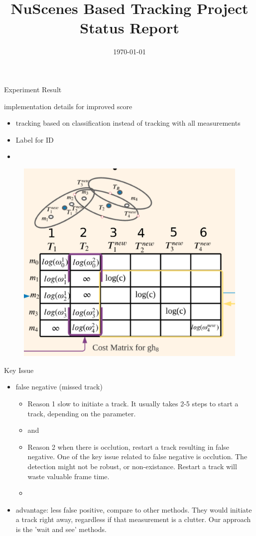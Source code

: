 \documentclass[aspectratio=169,xcolor=dvipsnames]{beamer}
\title{NuScenes Based Tracking Project Status Report} %
\date{\today} %
\begin{document}
\begin{frame}
    \titlepage
\end{frame}

\begin{frame}{Experiment Result}
    \href{https://docs.google.com/spreadsheets/d/e/2PACX-1vQg2MSCst4ShlC0e7T_lr_q4azo-DfDo53On89BjeisHAKJrggMLoTUxcvurpXomLZilYKoWmMMf6U4/pubhtml}{}
    \href{https://motchallenge.net/results/CVPR_2019_Tracking_Challenge/}{}
\end{frame}

\begin{frame}{implementation details for improved score}
    \begin{itemize}
        \item{tracking based on classification instead of tracking with all measurements}
        \item{Label for ID}
        \item {}
    \end{itemize}
    \begin{figure}
        \includegraphics[width=0.4\linewidth]{pmbm/2.png}
    \end{figure}
\end{frame}

\begin{frame}{Key Issue}
    \begin{itemize}
        \item{false negative (missed track)}
        \begin{itemize}
            \item{Reason 1 slow to initiate a track. It usually takes 2-5 steps to start a track, depending on the parameter. }
            \item { and }
            \item{Reason 2 when there is occlution, restart a track resulting in false negative. One of the key issue related to false negative is occlution. The detection might not be robust, or non-existance. Restart a track will waste valuable frame time. }
            \item {}
        \end{itemize}
        \item{advantage: less false positive, compare to other methods. They would initiate a track right away, regardless if that measurement is a clutter. Our approach is the 'wait and see' methods.}
    \end{itemize}
\end{frame}
\end{document}
